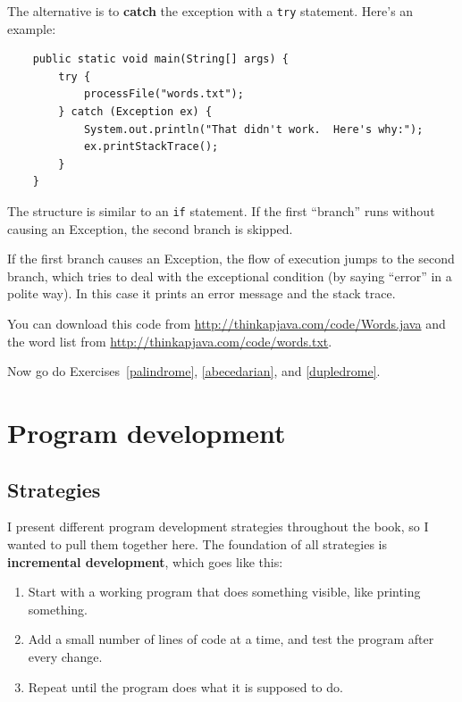 \documentclass[12pt]{book}
\theoremstyle{exercise}
\begin{document}
The alternative is to {\bf catch} the exception with a
{\tt try} statement.  Here's an example:

\begin{lstlisting}
    public static void main(String[] args) {
        try {
            processFile("words.txt");
        } catch (Exception ex) {
            System.out.println("That didn't work.  Here's why:");
            ex.printStackTrace();
        }
    }
\end{lstlisting}

The structure is similar to an {\tt if} statement.  If the first
``branch'' runs without causing an Exception, the second branch
is skipped.

If the first branch causes an Exception, the flow of execution jumps
to the second branch, which tries to deal with the exceptional
condition (by saying ``error'' in a polite way).  In this case it prints
an error message and the stack trace.

You can download this code from
\url{http://thinkapjava.com/code/Words.java}
and the word list from
\url{http://thinkapjava.com/code/words.txt}.

Now go do Exercises~\ref{palindrome}, \ref{abecedarian}, and \ref{dupledrome}.



\chapter{Program development}
\label{development}

\section{Strategies}

I present different program development strategies throughout
the book, so I wanted to pull them together here.
%
The foundation of all strategies is {\bf incremental development},
which goes like this:

\begin{enumerate}

\item Start with a working program that does something visible,
   like printing something.

\item Add a small number of lines of code at a time,
   and test the program after every change.

\item Repeat until the program does what it is supposed to do.

\end{enumerate}
\end{document}
